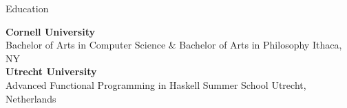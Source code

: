 
\begin{rSection}{Education}

	{\bf \large{Cornell University}} \hfill \color{darkgray}{08/2021 - 05/2025}
	\\ 
	Bachelor of Arts in Computer Science \& Bachelor of Arts in Philosophy \hfill Ithaca, NY \\
	\color{black}
	\footnotesize{\bf Utrecht University} \hfill {}
	\\ 
	\footnotesize{Advanced Functional Programming in Haskell Summer School} \hfill {\footnotesize{Utrecht, Netherlands}}

	\color{black}

\end{rSection}